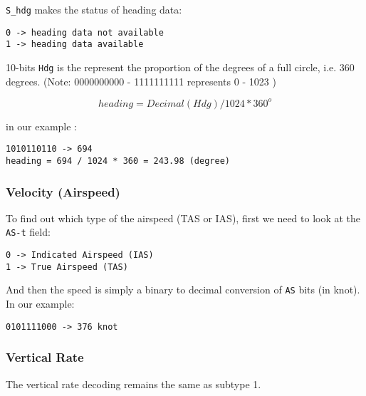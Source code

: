 \texttt{S\_hdg} makes the status of heading data:

\begin{verbatim}
0 -> heading data not available
1 -> heading data available
\end{verbatim}

10-bits \texttt{Hdg} is the represent the proportion of the degrees of a
full circle, i.e. 360 degrees. (Note: 0000000000 - 1111111111 represents
0 - 1023 )

\[heading = Decimal(Hdg) / 1024 * 360^o\]

in our example :

\begin{verbatim}
1010110110 -> 694
heading = 694 / 1024 * 360 = 243.98 (degree)
\end{verbatim}

\subsubsection{Velocity (Airspeed)}\label{velocity-airspeed}

To find out which type of the airspeed (TAS or IAS), first we need to
look at the \texttt{AS-t} field:

\begin{verbatim}
0 -> Indicated Airspeed (IAS)
1 -> True Airspeed (TAS)
\end{verbatim}

And then the speed is simply a binary to decimal conversion of
\texttt{AS} bits (in knot). In our example:

\begin{verbatim}
0101111000 -> 376 knot
\end{verbatim}

\subsubsection{Vertical Rate}\label{vertical-rate-1}

The vertical rate decoding remains the same as subtype 1.
